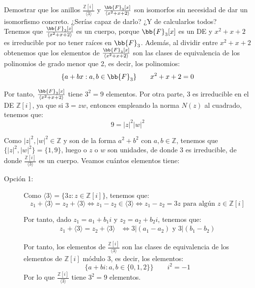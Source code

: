 \begin{ejercicio}
    Demostrar que los anillos $\frac{\mathbb{Z}[i]}{\langle 3 \rangle }$ y $\frac{\bb{F}_3[x]}{\langle x^2+x+2 \rangle }$ son isomorfos sin necesidad de dar un isomorfismo concreto. ¿Serías capaz de darlo? ¿Y de calcularlos todos?\\

    \noindent
    Tenemos que $\frac{\bb{F}_3[x]}{\langle x^2+x+2 \rangle }$ es un cuerpo, porque $\bb{F}_3[x]$ es un DE y $x^2+x+2$ es irreducible por no tener raíces en $\bb{F}_3$. Además, al dividir entre $x^2+x+2$ obtenemos que los elementos de $\frac{\bb{F}_3[x]}{\langle x^2+x+2 \rangle }$ son las clases de equivalencia de los polinomios de grado menor que 2, es decir, los polinomios:
    \begin{equation*}
        \{a+bx : a,b\in \bb{F}_3\}\qquad x^2+x+2 = 0
    \end{equation*}

    Por tanto, $\frac{\bb{F}_3[x]}{\langle x^2+x+2 \rangle }$ tiene $3^2 = 9$ elementos. Por otra parte, $3$ es irreducible en el DE $\mathbb{Z}[i]$, ya que si $3 = zw$, entonces empleando la norma $N(z)$ al cuadrado, tenemos que:
    \begin{equation*}
        9 = |z|^2 |w|^2 
    \end{equation*}

    Como $|z|^2, |w|^2 \in \mathbb{Z}$ y son de la forma $a^2+b^2$ con $a,b\in \mathbb{Z}$, tenemos que $\{|z|^2, |w|^2\}= \{1,9\}$, luego o $z$ o $w$ son unidades, de donde $3$ es irreducible, de donde $\frac{\mathbb{Z}[i]}{\langle 3 \rangle }$ es un cuerpo. Veamos cuántos elementos tiene:
    \begin{description}
        \item[Opción 1:] Como $\langle 3 \rangle = \{3z : z\in \mathbb{Z}[i]\}$, tenemos que:
        $$z_1 + \langle 3 \rangle = z_2 + \langle 3 \rangle\iff z_1 - z_2 \in \langle 3 \rangle \iff z_1 - z_2 = 3z \text{ para algún } z\in \mathbb{Z}[i]$$

        Por tanto, dado $z_1 = a_1 + b_1 i$ y $z_2 = a_2 + b_2 i$, tenemos que:
        \begin{align*}
            z_1 + \langle 3 \rangle = z_2 + \langle 3 \rangle &\iff 3|\left(a_1 - a_2\right) \text{ y } 3|\left(b_1 - b_2\right)
        \end{align*}

        Por tanto, los elementos de $\frac{\mathbb{Z}[i]}{\langle 3 \rangle }$ son las clases de equivalencia de los elementos de $\mathbb{Z}[i]$ módulo $3$, es decir, los elementos:
        \begin{equation*}
            \{a+bi : a,b\in \{0,1,2\}\}\qquad i^2 = -1
        \end{equation*}
        Por lo que $\frac{\mathbb{Z}[i]}{\langle 3 \rangle }$ tiene $3^2 = 9$ elementos.


\end{description}
\end{ejercicio}
